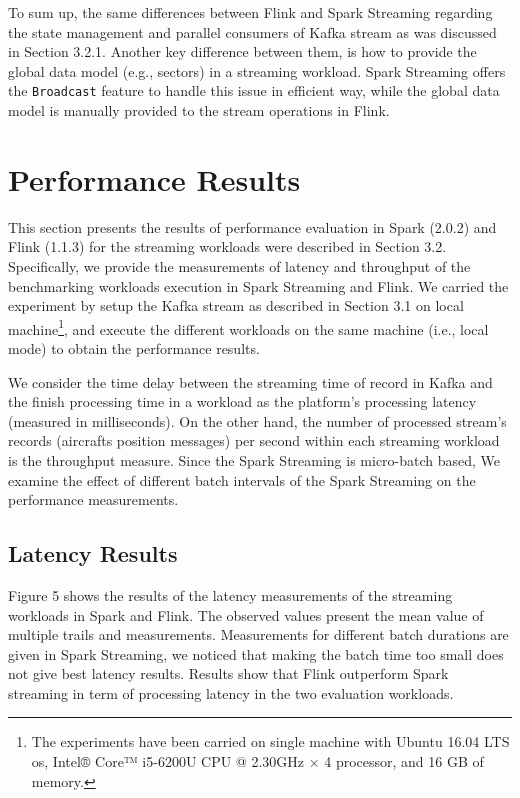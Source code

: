 \documentclass[]{article}
\begin{document}
 
 \par To sum up, the same differences between Flink and Spark Streaming regarding the state management and parallel  consumers of Kafka stream as was discussed in Section 3.2.1. Another key difference between them, is how  to provide the global data model (e.g., sectors) in a streaming workload. Spark Streaming offers the \texttt{Broadcast} feature to handle this issue in efficient way, while the global data model is manually provided  to the stream operations in Flink.
\section{Performance Results}

\par This section presents the results of performance evaluation in Spark (2.0.2) and Flink (1.1.3) for the streaming workloads were described in Section 3.2. Specifically, we provide  the measurements of latency and throughput of the benchmarking workloads execution in Spark Streaming and Flink. We carried the experiment by setup the Kafka stream as described in Section 3.1 on local machine\footnote{ The experiments have been carried  on single machine with Ubuntu 16.04 LTS os, Intel® Core™ i5-6200U CPU @ 2.30GHz × 4  processor, and 16 GB of memory.  }, and execute the different workloads on the same machine (i.e., local mode) to obtain the performance results.  

\par We consider the time delay between the streaming time of record in Kafka and the 
finish processing time in a workload as the platform's processing latency (measured in milliseconds). On the other hand, the number of processed stream's records (aircrafts position messages) per second within each streaming workload is the throughput measure. Since the Spark Streaming is micro-batch based,  We examine the effect of different batch intervals
of the Spark Streaming on the performance measurements.
\subsection{Latency Results}

Figure 5 shows the results of the latency measurements of the streaming workloads in Spark and Flink. The observed values present the mean value of multiple trails and measurements. Measurements for different batch durations are given in Spark Streaming, we noticed that making the batch time too small does not give best latency results. Results show that Flink outperform Spark streaming in term of processing latency in the two evaluation workloads.
\end{document}
